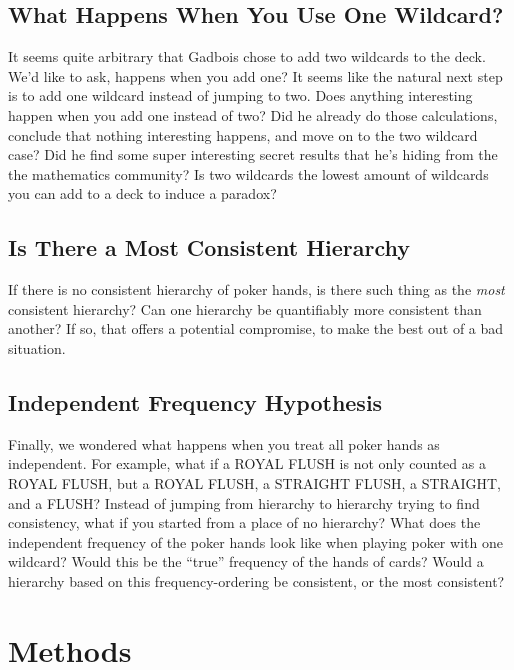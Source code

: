 \documentclass[16pt]{article}
\begin{document}
\subsection{What Happens When You Use One Wildcard?}
It seems quite arbitrary that Gadbois chose to add two wildcards to the deck. We'd like to ask, happens when you add one? It seems like the natural next step is to add one wildcard instead of jumping to two. Does anything interesting happen when you add one instead of two? Did he already do those calculations, conclude that nothing interesting happens, and move on to the two wildcard case? Did he find some super interesting secret results that he's hiding from the the mathematics community? Is two wildcards the lowest amount of wildcards you can add to a deck to induce a paradox?

\subsection{Is There a Most Consistent Hierarchy}
If there is no consistent hierarchy of poker hands, is there such thing as the \textit{most} consistent hierarchy? Can one hierarchy be quantifiably more consistent than another? If so, that offers a potential compromise, to make the best out of a bad situation.

\subsection{Independent Frequency Hypothesis}
Finally, we wondered what happens when you treat all poker hands as independent. For example, what if a ROYAL FLUSH is not only counted as a ROYAL FLUSH, but a ROYAL FLUSH, a STRAIGHT FLUSH, a STRAIGHT, and a FLUSH? Instead of jumping from hierarchy to hierarchy trying to find consistency, what if you started from a place of no hierarchy? What does the independent frequency of the poker hands look like when playing poker with one wildcard? Would this be the ``true'' frequency of the hands of cards? Would a hierarchy based on this frequency-ordering be consistent, or the most consistent?

\section{Methods}
\end{document}
